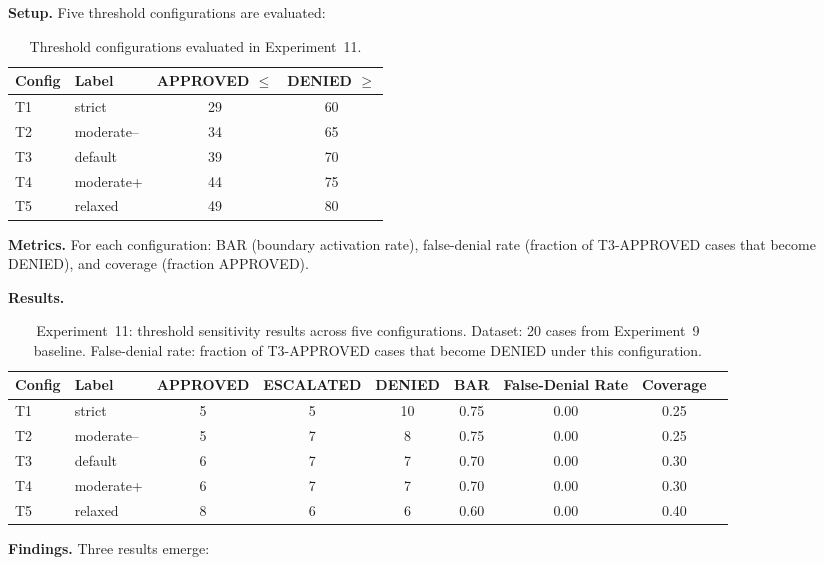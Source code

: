 \documentclass[11pt]{article}
\theoremstyle{definition}
\begin{document}
\textbf{Setup.}
Five threshold configurations are evaluated:

\begin{table}[h!]
\centering\small
\caption{Threshold configurations evaluated in Experiment~11.}
\label{tab:threshold-configs}
\begin{tabular}{@{}llcc@{}}
\toprule
Config & Label & APPROVED $\leq$ & DENIED $\geq$ \\
\midrule
T1 & strict     & 29 & 60 \\
T2 & moderate-- & 34 & 65 \\
T3 & default    & 39 & 70 \\
T4 & moderate+  & 44 & 75 \\
T5 & relaxed    & 49 & 80 \\
\bottomrule
\end{tabular}
\end{table}

\textbf{Metrics.}
For each configuration: BAR (boundary activation rate), false-denial rate
(fraction of T3-APPROVED cases that become DENIED), and coverage (fraction APPROVED).

\textbf{Results.}

\begin{table}[h!]
\centering\small
\caption{Experiment~11: threshold sensitivity results across five configurations.
Dataset: 20 cases from Experiment~9 baseline.
False-denial rate: fraction of T3-APPROVED cases that become DENIED under this configuration.}
\label{tab:threshold-sensitivity}
\begin{tabular}{@{}llccccccc@{}}
\toprule
Config & Label & APPROVED & ESCALATED & DENIED & BAR & False-Denial Rate & Coverage \\
\midrule
T1 & strict     & 5  & 5 & 10 & 0.75 & 0.00 & 0.25 \\
T2 & moderate-- & 5  & 7 & 8  & 0.75 & 0.00 & 0.25 \\
T3 & default    & 6  & 7 & 7  & 0.70 & 0.00 & 0.30 \\
T4 & moderate+  & 6  & 7 & 7  & 0.70 & 0.00 & 0.30 \\
T5 & relaxed    & 8  & 6 & 6  & 0.60 & 0.00 & 0.40 \\
\bottomrule
\end{tabular}
\end{table}

\textbf{Findings.}
Three results emerge:
\end{document}

